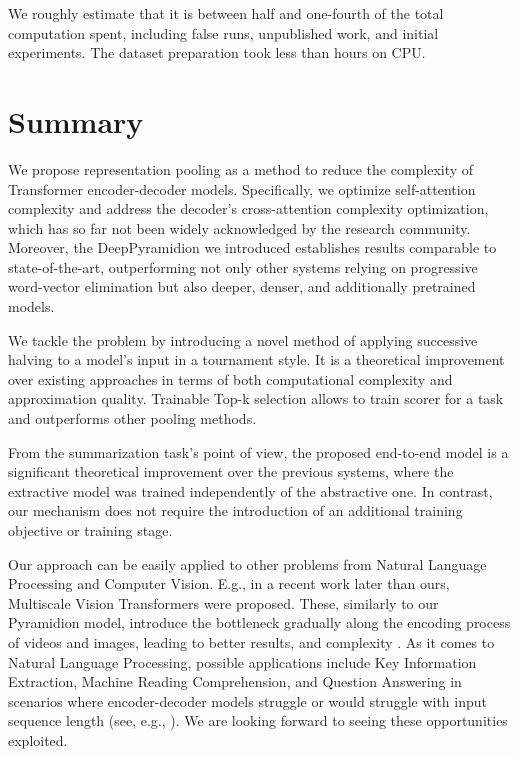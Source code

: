 \documentclass{article}
\begin{document}
We roughly estimate that it is between half and one-fourth of the total computation spent, including false runs, unpublished work, and initial experiments. The dataset preparation took less than  hours on  CPU.


\section{Summary}
We propose representation pooling as a method to reduce the complexity of Transformer encoder-decoder models. 
Specifically, we optimize self-attention complexity and address the decoder's cross-attention complexity optimization, which has so far not been widely acknowledged by the research community.
Moreover, the DeepPyramidion we introduced establishes results comparable to state-of-the-art, outperforming not only other systems relying on progressive word-vector elimination but also deeper, denser, and additionally pretrained models.

We tackle the problem by introducing a novel method of applying successive halving to a model's input in a tournament style. It is a theoretical improvement over existing approaches in terms of both computational complexity and approximation quality. 
Trainable Top-k selection allows to train scorer for a task and outperforms other pooling methods.

From the summarization task's point of view, the proposed end-to-end model is a significant theoretical improvement over the previous systems, where the extractive model was trained independently of the abstractive one. In contrast, our mechanism does not require the introduction of an additional training objective or training stage. 

Our approach can be easily applied to other problems from Natural Language Processing and Computer Vision. E.g., in a recent work later than ours, Multiscale Vision Transformers were proposed. These, similarly to our Pyramidion model, introduce the bottleneck gradually along the encoding process of videos and images, leading to better results, and complexity \cite{DBLP:journals/corr/abs-2104-11227}. As it comes to Natural Language Processing, possible applications include Key Information Extraction, Machine Reading Comprehension, and Question Answering in scenarios where encoder-decoder models struggle or would struggle with input sequence length (see, e.g., \citet{choi-etal-2017-coarse,townsend2021doc2dict,DBLP:journals/corr/abs-1712-07040}). We are looking forward to seeing these opportunities exploited.
\end{document}
